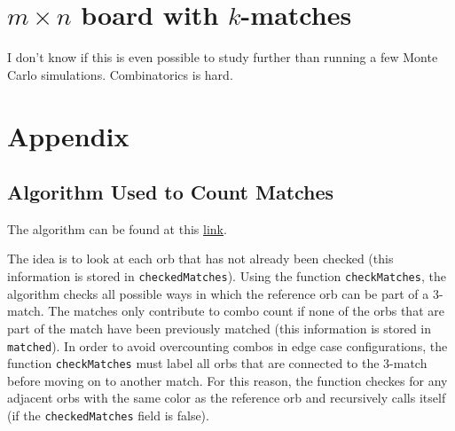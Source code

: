 \documentclass[12pt]{article}
\theoremstyle{definition}
\begin{document}
\section[mxn board with k-matches]{$m\times n$ board with $k$-matches}
I don't know if this is even possible to study further than running a few Monte Carlo simulations. Combinatorics is hard.
\section{Appendix}
\subsection{Algorithm Used to Count Matches}
The algorithm can be found at this \href{https://github.com/jli0108/jli0108.github.io/blob/master/pazudora-simulation/index.html}{link}.

The idea is to look at each orb that has not already been checked (this information is stored in \verb|checkedMatches|). Using the function \verb|checkMatches|, the algorithm checks all possible ways in which the reference orb can be part of a 3-match. The matches only contribute to combo count if none of the orbs that are part of the match have been previously matched (this information is stored in \verb|matched|). In order to avoid overcounting combos in edge case configurations, the function \verb|checkMatches| must label all orbs that are connected to the 3-match before moving on to another match. For this reason, the function checkes for any adjacent orbs with the same color as the reference orb and recursively calls itself (if the \verb|checkedMatches| field is false).
\end{document}
